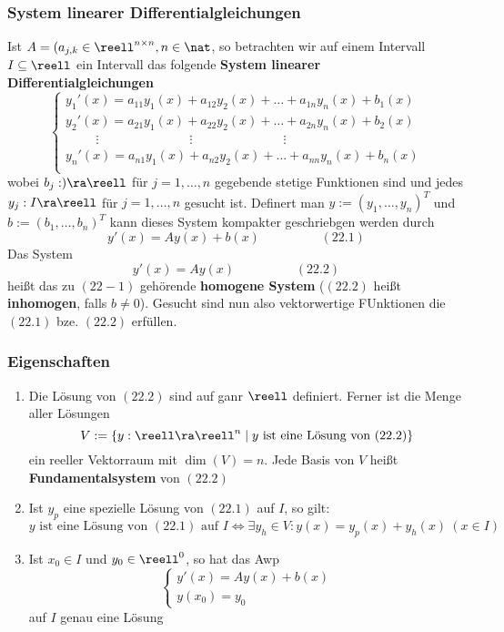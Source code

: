 \documentclass{kit}
\begin{document}
    \subsubsection{System linearer Differentialgleichungen}
      Ist $A=(a_{j,k}\in\reell^{n\times n},n\in\nat$, so betrachten wir auf einem Intervall $I\subseteq\reell$ ein Intervall
      das folgende \textbf{System linearer Differentialgleichungen}
      $$\begin{cases}
        y_1'(x)=a_{11}y_1(x)+a_{12}y_2(x)+\dots+a_{1n}y_n(x)+b_1(x)\\
        y_2'(x)=a_{21}y_1(x)+a_{22}y_2(x)+\dots+a_{2n}y_n(x)+b_2(x)\\
        \hspace{1cm}\vdots\hspace{3cm}\vdots\hspace{3cm}\vdots\\
        y_n'(x)=a_{n1}y_1(x)+a_{n2}y_2(x)+\dots+a_{nn}y_n(x)+b_n(x)\\
      \end{cases}$$
      wobei $b_j:)\ra\reell$ für $j=1,\dots,n$ gegebende stetige Funktionen sind und jedes $y_j:I\ra\reell$ für 
      $j=1,\dots,n$ gesucht ist. Definert man $y:=(y_1,\dots,y_n)^T$ und $b:=(b_1,\dots,b_n)^T$ kann dieses System kompakter
      geschriebgen werden durch
      $$y'(x)=Ay(x)+b(x)\hspace{2cm}(22.1)$$
      Das System
      $$y'(x)=Ay(x)\hspace{2cm}(22.2)$$
      heißt das zu $(22-1)$ gehörende \textbf{homogene System} ($(22.2)$ heißt \textbf{inhomogen}, falls $b\neq0$). Gesucht
      sind nun also vektorwertige FUnktionen die $(22.1)$ bze. $(22.2)$ erfüllen.
    \subsubsection{Eigenschaften}
      \begin{enumerate}
        \item Die Lösung von $(22.2)$ sind auf ganr $\reell$ definiert. Ferner ist die Menge aller Lösungen
          $$V:=\{y:\reell\ra\reell^n\mid y\text{ ist eine Lösung von }(22.2)\}$$
          ein reeller Vektorraum mit $\dim(V)=n$. Jede Basis von $V$ heißt \textbf{Fundamentalsystem} von $(22.2)$
        \item Ist $y_p$ eine spezielle Lösung von $(22.1)$ auf $I$, so gilt:
          $$y\text{ ist eine Lösung von $(22.1)$ auf $I$}\Longleftrightarrow\exists y_h\in V:y(x)=y_p(x)+y_h(x)\ (x\in I)$$
        \item Ist $x_0\in I$ und $y_0\in\reell^0$, so hat das Awp
          $$\begin{cases}
            y'(x)=Ay(x)+b(x)\\
            y(x_0)=y_0
          \end{cases}$$
          auf $I$ genau eine Lösung
      \end{enumerate}
\end{document}

